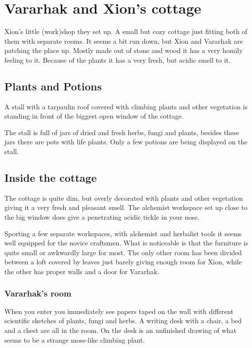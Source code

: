 \chapter{Vararhak and Xion's cottage}
\label{shop}

 Xion's little (work)shop they set up. 
A small but cozy cottage just fitting both of them with separate rooms. It seems a bit run down, but Xion and Vararhak are patching the place up. Mostly made out of stone and wood it has a very homily feeling to it. Because of the plants it has a very fresh, but acidic smell to it.

\section{Plants and Potions}
A stall with a tarpaulin roof covered with climbing plants and other vegetation is standing in front of the biggest open window of the cottage. 

The stall is full of jars of dried and fresh herbs, fungi and plants, besides these jars there are pots with life plants. Only a few potions are being displayed on the stall.



\section{Inside the cottage}
The cottage is quite dim, but overly decorated with plants and other vegetation giving it a very fresh and pleasant smell. The alchemist workspace set up close to the big window does give a penetrating acidic tickle in your nose. 

Sporting a few separate workspaces, with alchemist and herbalist tools it seems well equipped for the novice craftsmen. What is noticeable is that the furniture is quite small or awkwardly large for most. The only other room has been divided between a loft covered by leaves just barely giving enough room for Xion, while the other has proper walls and a door for Vararhak.

\subsection{Vararhak's room}
When you enter you immediately see papers taped on the wall with different scientific sketches of plants, fungi and herbs. A writing desk with a chair, a bed and a chest are all in the room. On the desk is an unfinished drawing of what seems to be a strange moss-like climbing plant.
